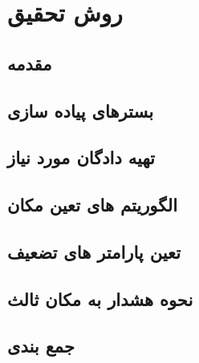 \chapter{روش تحقیق}

	\section{مقدمه}
	

	\section{بسترهای پیاده سازی}
	
	
	\section{تهیه دادگان مورد نیاز}

	\section{الگوریتم های تعین مکان}

	\section{تعین پارامتر های تضعیف}

	\section{نحوه هشدار به مکان ثالث}

	\section{جمع بندی}
